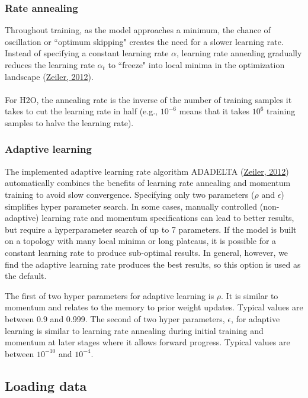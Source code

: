 \documentclass{article}[11pt]
\begin{document}
\subsubsection{Rate annealing} 
\label{sssec:RateAnnealing}

Throughout training, as the model approaches a minimum, the chance of oscillation or ``optimum skipping" creates the need for a slower learning rate. Instead of specifying a constant learning rate $\alpha$, learning rate annealing gradually reduces the learning rate $\alpha_t$ to ``freeze" into local minima in the optimization landscape (\href{http://arxiv.org/pdf/1212.5701v1.pdf}{Zeiler, 2012}).  
\\
\\
For H2O, the annealing rate is the inverse of the number of training samples it takes to cut the learning rate in half (e.g., $10^{-6}$ means that it takes $10^6$ training samples to halve the learning rate).

\subsubsection{Adaptive learning} 
\label{sssec:AdaptiveLearning}
The implemented adaptive learning rate algorithm ADADELTA (\href{http://arxiv.org/pdf/1212.5701v1.pdf}{Zeiler, 2012})  automatically combines the benefits of learning rate annealing and momentum training to avoid slow convergence. Specifying only two parameters ($\rho$ and $\epsilon$)  simplifies hyper parameter search. In some cases, manually controlled (non-adaptive) learning rate and momentum specifications can lead to better results, but require a hyperparameter search of up to 7 parameters. If the model is built on a topology with many local minima or long plateaus, it is possible for a constant learning rate to produce sub-optimal results. In general, however, we find the adaptive learning rate produces the best results, so this option is used as the default. 

The first of two hyper parameters for adaptive learning is $\rho$. It is similar to momentum and relates to the memory to prior weight updates. Typical values are between 0.9 and 0.999. The second of two hyper parameters, $\epsilon$, for adaptive learning is similar to learning rate annealing during initial training and momentum at later stages where it allows forward progress.
Typical values are between $10^{-10}$ and $10^{-4}$.

\subsection{Loading data} 
\end{document}

